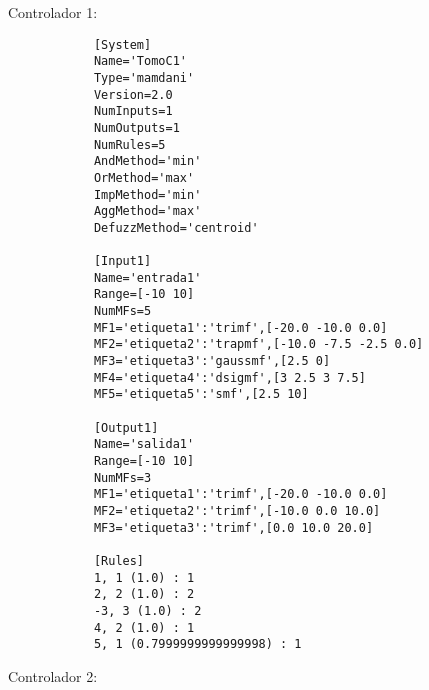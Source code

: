     
    Controlador 1:

    \begin{longlisting}				
        \begin{verbatim}
            [System]
            Name='TomoC1'
            Type='mamdani'
            Version=2.0
            NumInputs=1
            NumOutputs=1
            NumRules=5
            AndMethod='min'
            OrMethod='max'
            ImpMethod='min'
            AggMethod='max'
            DefuzzMethod='centroid'

            [Input1]
            Name='entrada1'
            Range=[-10 10]
            NumMFs=5
            MF1='etiqueta1':'trimf',[-20.0 -10.0 0.0]
            MF2='etiqueta2':'trapmf',[-10.0 -7.5 -2.5 0.0]
            MF3='etiqueta3':'gaussmf',[2.5 0]
            MF4='etiqueta4':'dsigmf',[3 2.5 3 7.5]
            MF5='etiqueta5':'smf',[2.5 10]

            [Output1]
            Name='salida1'
            Range=[-10 10]
            NumMFs=3
            MF1='etiqueta1':'trimf',[-20.0 -10.0 0.0]
            MF2='etiqueta2':'trimf',[-10.0 0.0 10.0]
            MF3='etiqueta3':'trimf',[0.0 10.0 20.0]

            [Rules]
            1, 1 (1.0) : 1
            2, 2 (1.0) : 2
            -3, 3 (1.0) : 2
            4, 2 (1.0) : 1
            5, 1 (0.7999999999999998) : 1
        \end{verbatim}
    \end{longlisting}

    Controlador 2:

